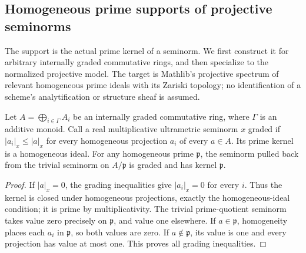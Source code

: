 \subsection{Homogeneous prime supports of projective seminorms}
\label{subsec:projective-support}

The support is the actual prime kernel of a seminorm. We first construct it
for arbitrary internally graded commutative rings, and then specialize to the
normalized projective model. The target is Mathlib's projective spectrum of
relevant homogeneous prime ideals with its Zariski topology; no identification
of a scheme's analytification or structure sheaf is assumed.

\begin{lemma}
\label{spectrum:graded-support}
\leanok
{}
Let $A=\bigoplus_{i\in\Gamma} A_i$ be an internally graded commutative ring,
where $\Gamma$ is an additive monoid. Call a real multiplicative ultrametric
seminorm $x$ graded if $|a_i|_x\le |a|_x$ for every homogeneous projection
$a_i$ of every $a\in A$. Its prime kernel is a homogeneous ideal.
For any homogeneous prime $\mathfrak p$, the seminorm pulled back from the
trivial seminorm on $A/\mathfrak p$ is graded and has kernel $\mathfrak p$.
\end{lemma}
\begin{proof}
If $|a|_x=0$, the grading inequalities give $|a_i|_x=0$ for every $i$.
Thus the kernel is closed under homogeneous projections, exactly the
homogeneous-ideal condition; it is prime by multiplicativity.
The trivial prime-quotient seminorm takes value zero precisely on
$\mathfrak p$, and value one elsewhere. If $a\in\mathfrak p$, homogeneity
places each $a_i$ in $\mathfrak p$, so both values are zero.
If $a\notin\mathfrak p$, its value is one and every projection has value
at most one. This proves all grading inequalities.
\end{proof}

